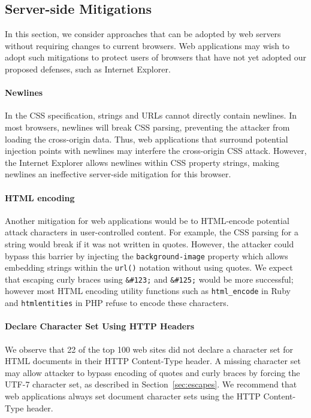 \documentclass{acm_proc_article-sp}
\begin{document}
\subsection{Server-side Mitigations}
In this section, we consider approaches that can be adopted by web servers
without requiring changes to current browsers. Web applications may wish to
adopt such mitigations to protect users of browsers that have not yet adopted
our proposed defenses, such as Internet Explorer.

\paragraph{Newlines}
In the CSS specification, strings and URLs cannot directly contain newlines.
In most browsers, newlines will break CSS parsing, preventing the attacker from loading the cross-origin data.
Thus, web applications that surround potential injection points with
newlines may interfere the cross-origin CSS attack.
However, the Internet Explorer allows newlines within CSS
property strings, making newlines an ineffective server-side mitigation for this browser.

\paragraph{HTML encoding}
Another mitigation for web applications would be to HTML-encode potential attack characters in user-controlled content. For example, the CSS parsing for a string would break if it was not written in quotes. However, the attacker could bypass this barrier by injecting the \texttt{background-image} property which allows embedding strings within the \texttt{url()} notation without using quotes. We expect that escaping curly braces using \verb|&#123;| and \verb|&#125;| would be more successful; however most HTML encoding utility functions such as \verb|html_encode| in Ruby and \verb|htmlentities| in PHP refuse to encode these characters.

\paragraph{Declare Character Set Using HTTP Headers}

We observe that 22 of the top 100 web sites did not declare a character set
for HTML documents in their HTTP Content-Type header. A missing character set
may allow attacker to bypass encoding of quotes and curly braces by forcing
the UTF-7 character set, as described in Section~\ref{sec:escapes}. We
recommend that web applications always set document character sets using the HTTP Content-Type header.
\end{document}
